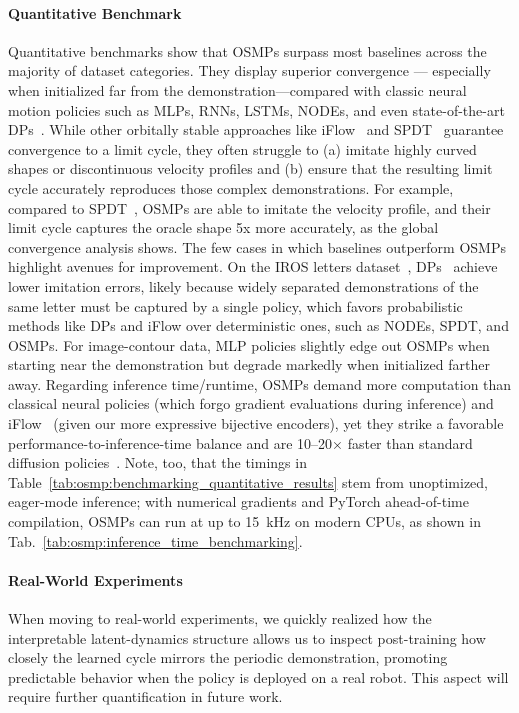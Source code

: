 \paragraph{Quantitative Benchmark}
Quantitative benchmarks show that \glspl{OSMP} surpass most baselines across the majority of dataset categories. They display superior convergence — especially when initialized far from the demonstration—compared with classic neural motion policies such as \glspl{MLP}, \glspl{RNN}, \glspl{LSTM}, \glspl{NODE}, and even state-of-the-art \glspl{DP}~\citep{chi2023diffusion}. While other orbitally stable approaches like iFlow~\citep{urain2020imitationflow} and \gls{SPDT}~\citep{zhi2024teaching} guarantee convergence to a limit cycle, they often struggle to (a) imitate highly curved shapes or discontinuous velocity profiles and (b) ensure that the resulting limit cycle accurately reproduces those complex demonstrations.
For example, compared to SPDT~\citep{zhi2024teaching}, \glspl{OSMP} are able to imitate the velocity profile, and their limit cycle captures the oracle shape 5x more accurately, as the global convergence analysis shows.
The few cases in which baselines outperform \glspl{OSMP} highlight avenues for improvement. On the IROS letters dataset~\citep{urain2020imitationflow}, DPs~\citep{chi2023diffusion} achieve lower imitation errors, likely because widely separated demonstrations of the same letter must be captured by a single policy, which favors probabilistic methods like \glspl{DP} and iFlow over deterministic ones, such as NODEs, SPDT, and \glspl{OSMP}. For image-contour data, MLP policies slightly edge out \glspl{OSMP} when starting near the demonstration but degrade markedly when initialized farther away.
Regarding inference time/runtime, \glspl{OSMP} demand more computation than classical neural policies (which forgo gradient evaluations during inference) and iFlow~\citep{urain2020imitationflow} (given our more expressive bijective encoders), yet they strike a favorable performance-to-inference-time balance and are 10–20× faster than standard diffusion policies~\citep{chi2023diffusion}. Note, too, that the timings in Table~\ref{tab:osmp:benchmarking_quantitative_results} stem from unoptimized, eager-mode inference; with numerical gradients and PyTorch ahead-of-time compilation, \glspl{OSMP} can run at up to \SI{15}{kHz} on modern CPUs, as shown in Tab.~\ref{tab:osmp:inference_time_benchmarking}.

\paragraph{Real-World Experiments}
When moving to real-world experiments, we quickly realized how the interpretable latent-dynamics structure allows us to inspect post-training how closely the learned cycle mirrors the periodic demonstration, promoting predictable behavior when the policy is deployed on a real robot.
This aspect will require further quantification in future work.

